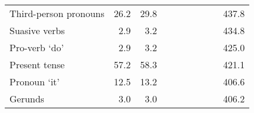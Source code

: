 \begin{table}[!t]
\begin{tabular*}{\linewidth}{@{\extracolsep{\fill}}lrrrrrrrrr}
Third-person pronouns & 26.2 & 29.8 & {\cellcolor[HTML]{F7F7F7}{\textcolor[HTML]{000000}{91\%}}} & {\cellcolor[HTML]{F7F7F7}{\textcolor[HTML]{000000}{91\%}}} & {\cellcolor[HTML]{F7F7F7}{\textcolor[HTML]{000000}{108\%}}} & {\cellcolor[HTML]{F7F7F7}{\textcolor[HTML]{000000}{104\%}}} & {\cellcolor[HTML]{D1E5F0}{\textcolor[HTML]{000000}{123\%}}} & {\cellcolor[HTML]{D1E5F0}{\textcolor[HTML]{000000}{120\%}}} & 437.8 \\ 
Suasive verbs & 2.9 & 3.2 & {\cellcolor[HTML]{F7F7F7}{\textcolor[HTML]{000000}{98\%}}} & {\cellcolor[HTML]{D1E5F0}{\textcolor[HTML]{000000}{116\%}}} & {\cellcolor[HTML]{FDDBC7}{\textcolor[HTML]{000000}{89\%}}} & {\cellcolor[HTML]{F7F7F7}{\textcolor[HTML]{000000}{90\%}}} & {\cellcolor[HTML]{92C5DE}{\textcolor[HTML]{000000}{141\%}}} & {\cellcolor[HTML]{92C5DE}{\textcolor[HTML]{000000}{137\%}}} & 434.8 \\ 
Pro-verb ‘do’ & 2.9 & 3.2 & {\cellcolor[HTML]{D6604D}{\textcolor[HTML]{FFFFFF}{25\%}}} & {\cellcolor[HTML]{D6604D}{\textcolor[HTML]{FFFFFF}{26\%}}} & {\cellcolor[HTML]{F4A582}{\textcolor[HTML]{000000}{60\%}}} & {\cellcolor[HTML]{F4A582}{\textcolor[HTML]{000000}{59\%}}} & {\cellcolor[HTML]{D1E5F0}{\textcolor[HTML]{000000}{115\%}}} & {\cellcolor[HTML]{F7F7F7}{\textcolor[HTML]{000000}{109\%}}} & 425.0 \\ 
Present tense & 57.2 & 58.3 & {\cellcolor[HTML]{FDDBC7}{\textcolor[HTML]{000000}{82\%}}} & {\cellcolor[HTML]{FDDBC7}{\textcolor[HTML]{000000}{76\%}}} & {\cellcolor[HTML]{F7F7F7}{\textcolor[HTML]{000000}{99\%}}} & {\cellcolor[HTML]{F7F7F7}{\textcolor[HTML]{000000}{100\%}}} & {\cellcolor[HTML]{D1E5F0}{\textcolor[HTML]{000000}{119\%}}} & {\cellcolor[HTML]{D1E5F0}{\textcolor[HTML]{000000}{116\%}}} & 421.1 \\ 
Pronoun ‘it’ & 12.5 & 13.2 & {\cellcolor[HTML]{FDDBC7}{\textcolor[HTML]{000000}{88\%}}} & {\cellcolor[HTML]{F7F7F7}{\textcolor[HTML]{000000}{92\%}}} & {\cellcolor[HTML]{F7F7F7}{\textcolor[HTML]{000000}{105\%}}} & {\cellcolor[HTML]{F7F7F7}{\textcolor[HTML]{000000}{105\%}}} & {\cellcolor[HTML]{F7F7F7}{\textcolor[HTML]{000000}{108\%}}} & {\cellcolor[HTML]{F7F7F7}{\textcolor[HTML]{000000}{105\%}}} & 406.6 \\ 
Gerunds & 3.0 & 3.0 & {\cellcolor[HTML]{92C5DE}{\textcolor[HTML]{000000}{156\%}}} & {\cellcolor[HTML]{92C5DE}{\textcolor[HTML]{000000}{152\%}}} & {\cellcolor[HTML]{D1E5F0}{\textcolor[HTML]{000000}{119\%}}} & {\cellcolor[HTML]{D1E5F0}{\textcolor[HTML]{000000}{124\%}}} & {\cellcolor[HTML]{FDDBC7}{\textcolor[HTML]{000000}{83\%}}} & {\cellcolor[HTML]{FDDBC7}{\textcolor[HTML]{000000}{86\%}}} & 406.2 \\ 

\end{tabular*}
\end{table}
